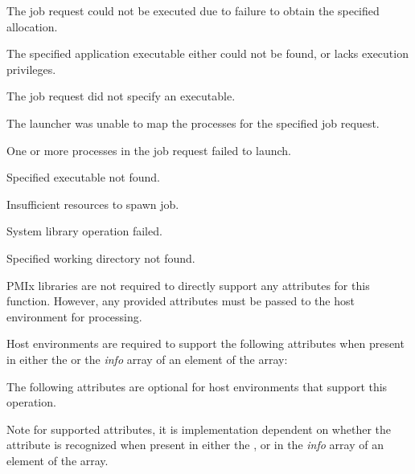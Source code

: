 \returnstart
\begin{constantdesc}
\item {} The job request could not be executed due to failure to obtain the specified allocation.
\item {} The specified application executable either could not be found, or lacks execution privileges.
\item {} The job request did not specify an executable.
\item {} The launcher was unable to map the processes for the specified job request.
\item {} One or more processes in the job request failed to launch.
\item {} Specified executable not found.
\item {} Insufficient resources to spawn job.
\item {} System library operation failed.
\item {} Specified working directory not found.
\end{constantdesc}
\returnend

\reqattrstart
\ac{PMIx} libraries are not required to directly support any attributes for this function. However, any provided attributes must be passed to the host environment for processing.

Host environments are required to support the following attributes when present in either the  or the \textit{info} array of an element of the  array:


\reqattrend

\optattrstart
The following attributes are optional for host environments that support this operation.

Note for supported attributes, it is implementation dependent on whether the
attribute is recognized when present in either the , or in
the \textit{info} array of an element of the  array.

